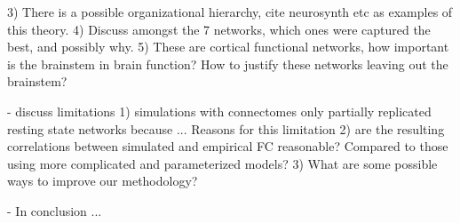 \documentclass{article}
\begin{document}
 3) There is a possible organizational hierarchy, cite neurosynth etc as examples of this theory.
 4) Discuss amongst the 7 networks, which ones were captured the best, and possibly why.
 5) These are cortical functional networks, how important is the brainstem in brain function? How to justify these networks leaving out the brainstem?

 - discuss limitations
 1) simulations with connectomes only partially replicated resting state networks because ... Reasons for this limitation
 2) are the resulting correlations between simulated and empirical FC reasonable? Compared to those using more complicated and parameterized models?
 3) What are some possible ways to improve our methodology?

 - In conclusion ...





\end{document}
